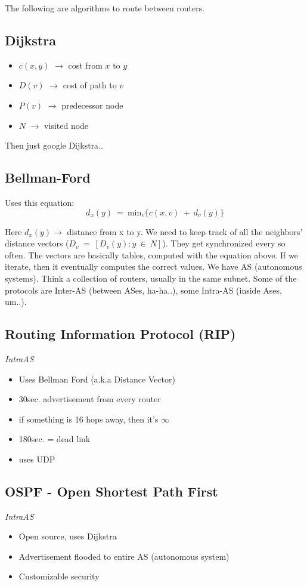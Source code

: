 \documentclass{article}
\begin{document}
The following are algorithms to route between routers.
\subsection{Dijkstra}
\begin{itemize}
    \item $c(x, y)$ $\rightarrow$ cost from $x$ to $y$
    \item $D(v)$ $\rightarrow$ cost of path to $v$
    \item $P(v)$ $\rightarrow$ predecessor node
    \item $N$ $\rightarrow$ visited node
\end{itemize}

Then just google Dijkstra..
\subsection{Bellman-Ford}
Uses this equation:
\begin{equation}
    d_x(y)\ =\ \text{min}_v \{ c(x, v)\ +\ d_v(y) \}
\end{equation}

Here $d_x(y) \rightarrow$ distance from x to y. We need to keep track of all the neighbors' distance vectors ($D_v\ =\ [D_v(y): y\ \in\ N]$). They get synchronized every so often. The vectors are basically tables, computed with the equation above. If we iterate, then it eventually computes the correct values.
\vskip 0.1in
We have AS (autonomous systems). Think a collection of routers, usually in the same subnet. Some of the protocols are Inter-AS (between ASes, ha-ha..), some Intra-AS (inside Ases, um..).

\subsection{Routing Information Protocol (RIP)}
\textit{IntraAS}
\begin{itemize}
    \item Uses Bellman Ford (a.k.a Distance Vector)
    \item 30sec. advertisement from every router
    \item if something is 16 hops away, then it's $\infty$
    \item 180sec. = dead link
    \item uses UDP
\end{itemize}

\subsection{OSPF - Open Shortest Path First}
\textit{IntraAS}
\begin{itemize}
    \item Open source, uses Dijkstra
    \item Advertisement flooded to entire AS (autonomous system)
    \item Customizable security 
\end{itemize}
\end{document}
